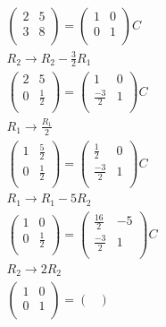 \documentclass{article}
\begin{document}
\begin{align*}
    \begin{pmatrix} 2 & 5 \\ 3 & 8 \\ \end{pmatrix} = \begin{pmatrix}
    1 & 0 \\ 0 & 1 \\ \end{pmatrix}C \\
    R_2 \rightarrow R_2 - \frac{3}{2}R_1\\
    \begin{pmatrix} 2 & 5 \\ 0 & \frac{1}{2} \\ \end{pmatrix} = \begin{pmatrix}
    1 & 0 \\\frac{-3}{2} & 1 \\ \end{pmatrix}C \\
    R_1 \rightarrow \frac{R_1}{2}\\
   \begin{pmatrix} 1 & \frac{5}{2} \\ 0 & \frac{1}{2} \\ \end{pmatrix} = \begin{pmatrix}
    \frac{1}{2} & 0 \\ \frac{-3}{2} & 1 \\ \end{pmatrix}C \\
     R_1 \rightarrow R_1 - 5R_2 \\
    \begin{pmatrix} 1 & 0 \\ 0 & \frac{1}{2} \\ \end{pmatrix} = \begin{pmatrix}
    \frac{16}{2} & -5 \\ \frac{-3}{2} & 1 \\ \end{pmatrix}C \\
    R_2 \rightarrow 2R_2 \\
     \begin{pmatrix} 1 & 0 \\ 0 & 1 \\ \end{pmatrix} = \begin{pmatrix}

\end{pmatrix}
\end{align*}
\end{document}
